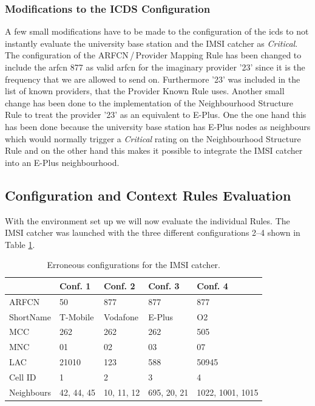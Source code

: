 \subsubsection{Modifications to the ICDS Configuration}
A few small modifications have to be made to the configuration of the \gls{icds} to not instantly evaluate the university base station and the IMSI catcher as \emph{Critical}.
The configuration of the ARFCN\,/\,Provider Mapping Rule has been changed to include the \gls{arfcn} 877 as valid \gls{arfcn} for the imaginary provider '23' since it is the frequency that we are allowed to send on.
Furthermore '23' was included in the list of known providers, that the Provider Known Rule uses.
Another small change has been done to the implementation of the Neighbourhood Structure Rule to treat the provider '23' as an equivalent to E-Plus.
One the one hand this has been done because the university base station has E-Plus nodes as neighbours which would normally trigger a \emph{Critical} rating on the Neighbourhood Structure Rule and on the other hand this makes it possible to integrate the IMSI catcher into an E-Plus neighbourhood.

\subsection{Configuration and Context Rules Evaluation}
With the environment set up we will now evaluate the individual Rules.
The IMSI catcher was launched with the three different configurations 2--4 shown in Table \ref{tab:err_configs}.
\begin{table}
\centering
\begin{tabular}{lllll}
\toprule
			&Conf. 1		&Conf. 2		&Conf. 3		&Conf. 4\\
\midrule
ARFCN		&50				&877			&877			&877	\\
ShortName	&T-Mobile		&Vodafone		&E-Plus			&O2		\\
MCC			&262			&262			&262			&505	\\
MNC			&01				&02				&03				&07	\\
LAC			&21010			&123			&588			&50945	\\
Cell ID		&1				&2				&3				&4		\\
Neighbours	&42, 44, 45		&10, 11, 12		&695, 20, 21	&1022, 1001, 1015\\
\bottomrule
\end{tabular}
\caption{Erroneous configurations for the IMSI catcher.}
\label{tab:err_configs}
\end{table}

